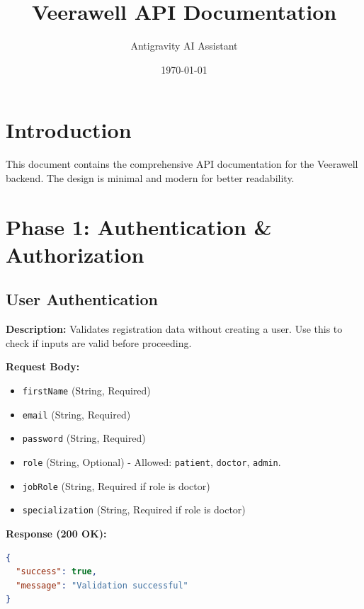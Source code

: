 \documentclass{article}
\title{\textbf{Veerawell API Documentation}}
\author{Antigravity AI Assistant}
\date{\today}
\begin{document}
\maketitle
\tableofcontents
\newpage

\section{Introduction}
This document contains the comprehensive API documentation for the Veerawell backend. The design is minimal and modern for better readability.

\section{Phase 1: Authentication \& Authorization}

\subsection{User Authentication}

\begin{tcolorbox}[title=\textcolor{accent}{POST} /api/auth/validate-registration]
\textbf{Description:} Validates registration data without creating a user. Use this to check if inputs are valid before proceeding.

\vspace{0.5em}
\textbf{Request Body:}
\begin{itemize}
    \item \texttt{firstName} (String, Required)
    \item \texttt{email} (String, Required)
    \item \texttt{password} (String, Required)
    \item \texttt{role} (String, Optional) - Allowed: \texttt{patient}, \texttt{doctor}, \texttt{admin}.
    \item \texttt{jobRole} (String, Required if role is doctor)
    \item \texttt{specialization} (String, Required if role is doctor)
\end{itemize}

\vspace{0.5em}
\textbf{Response (200 OK):}
\begin{lstlisting}[language=json]
{
  "success": true,
  "message": "Validation successful"
}
\end{lstlisting}
\end{tcolorbox}
\end{document}
